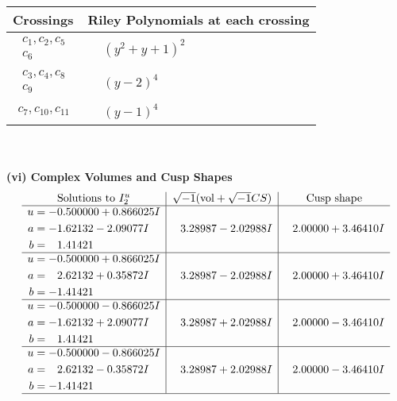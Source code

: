 \documentclass[1p]{elsarticle_modified}
\theoremstyle{definition}
\newcommand{\I}{\sqrt{-1}}
\begin{document}
\begin{tabular}{m{50pt}|m{274pt}}
Crossings & \hspace{64pt}Riley Polynomials at each crossing \\
\hline $$\begin{aligned}c_{1},c_{2},c_{5}\\c_{6}\end{aligned}$$&$\begin{aligned}
&(y^2+y+1)^2
\end{aligned}$\\
\hline $$\begin{aligned}c_{3},c_{4},c_{8}\\c_{9}\end{aligned}$$&$\begin{aligned}
&(y-2)^4
\end{aligned}$\\
\hline $$\begin{aligned}c_{7},c_{10},c_{11}\end{aligned}$$&$\begin{aligned}
&(y-1)^4
\end{aligned}$\\
\hline
\end{tabular}\\~\\
\newpage\flushleft \textbf{(vi) Complex Volumes and Cusp Shapes}
$$\begin{array}{c|c|c}  
\text{Solutions to }I^u_{2}& \I (\text{vol} + \sqrt{-1}CS) & \text{Cusp shape}\\
 \hline 
\begin{aligned}
u &= -0.500000 + 0.866025 I \\
a &= -1.62132 - 2.09077 I \\
b &= \phantom{-}1.41421\phantom{ +0.000000I}\end{aligned}
 & \phantom{-}3.28987 - 2.02988 I & \phantom{-}2.00000 + 3.46410 I \\ \hline\begin{aligned}
u &= -0.500000 + 0.866025 I \\
a &= \phantom{-}2.62132 + 0.35872 I \\
b &= -1.41421\phantom{ +0.000000I}\end{aligned}
 & \phantom{-}3.28987 - 2.02988 I & \phantom{-}2.00000 + 3.46410 I \\ \hline\begin{aligned}
u &= -0.500000 - 0.866025 I \\
a &= -1.62132 + 2.09077 I \\
b &= \phantom{-}1.41421\phantom{ +0.000000I}\end{aligned}
 & \phantom{-}3.28987 + 2.02988 I & \phantom{-}2.00000 - 3.46410 I \\ \hline\begin{aligned}
u &= -0.500000 - 0.866025 I \\
a &= \phantom{-}2.62132 - 0.35872 I \\
b &= -1.41421\phantom{ +0.000000I}\end{aligned}
 & \phantom{-}3.28987 + 2.02988 I & \phantom{-}2.00000 - 3.46410 I\\
 \hline 
 \end{array}$$\newpage\newpage\renewcommand{\arraystretch}{1}
\end{document}
